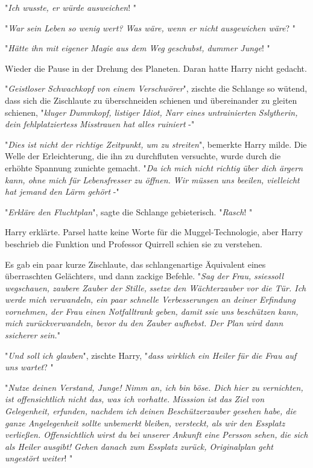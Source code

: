 {"\emph{Ich wusste, er würde ausweichen}! "

"\emph{War} \emph{sein Leben so wenig wert? Was wäre, wenn er nicht} \emph{ausgewichen wäre}? "

"\emph{Hätte ihn mit eigener Magie aus dem Weg geschubst, dummer Junge}! "

Wieder die Pause in der Drehung des Planeten. Daran hatte Harry nicht gedacht.

"\emph{Geistloser Schwachkopf von einem Verschwörer}", zischte die Schlange so wütend, dass sich die Zischlaute zu überschneiden schienen und übereinander zu gleiten schienen, "\emph{kluger Dummkopf, listiger Idiot, Narr eines untrainierten} \emph{Sslytherin, dein} \emph{fehlplatziertess} \emph{Misstrauen hat alles ruiniert} -"

"\emph{Dies ist nicht der richtige Zeitpunkt, um zu streiten}", bemerkte Harry milde. Die Welle der Erleichterung, die ihn zu durchfluten versuchte, wurde durch die erhöhte Spannung zunichte gemacht. "\emph{Da ich mich nicht richtig über dich ärgern kann, ohne mich für Lebensfresser zu öffnen. Wir müssen uns beeilen, vielleicht hat jemand den Lärm gehört} -"

"\emph{Erkläre den Fluchtplan}", sagte die Schlange gebieterisch. "\emph{Rasch}! "

Harry erklärte. Parsel hatte keine Worte für die Muggel-Technologie, aber Harry beschrieb die Funktion und Professor Quirrell schien sie zu verstehen.

Es gab ein paar kurze Zischlaute, das schlangenartige Äquivalent eines überraschten Gelächters, und dann zackige Befehle. "\emph{Sag der Frau,} \emph{ssiessoll} \emph{wegschauen, zaubere Zauber der Stille,} \emph{ssetze} \emph{den Wächterzauber vor die Tür. Ich werde mich verwandeln, ein paar schnelle Verbesserungen an deiner Erfindung vornehmen, der Frau einen Notfalltrank geben, damit} \emph{ssie} \emph{uns beschützen kann, mich zurückverwandeln, bevor du den Zauber aufhebst. Der Plan wird dann} \emph{ssicherer} \emph{sein.}"

"\emph{Und soll ich glauben}", zischte Harry, "\emph{dass wirklich ein Heiler für die Frau auf uns wartet}? "

"\emph{Nutze deinen Verstand, Junge! Nimm an, ich bin böse. Dich hier zu vernichten, ist offensichtlich nicht das, was ich vorhatte.} \emph{Misssion} \emph{ist das Ziel von Gelegenheit, erfunden, nachdem ich deinen Beschützerzauber gesehen habe, die ganze Angelegenheit sollte} \emph{unbemerkt bleiben, versteckt, als wir} \emph{den Essplatz verließen. Offensichtlich} \emph{wirst du} \emph{bei} \emph{unserer} \emph{Ankunft} \emph{eine} \emph{Persson sehen,} \emph{die} \emph{sich als Heiler ausgibt! Gehen danach zum Essplatz zurück, Originalplan} \emph{geht} \emph{ungestört weiter}! "

}
